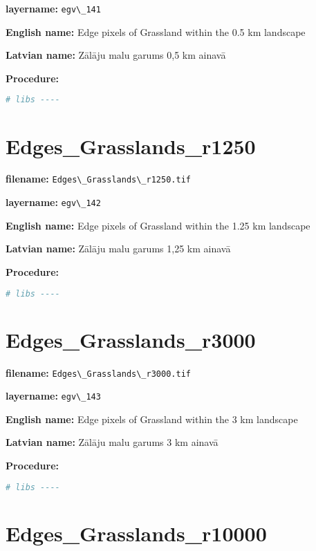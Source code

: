 \documentclass[
]{book}
\newcommand{\passthrough}[1]{#1}
\begin{document}
\textbf{layername:} \passthrough{\lstinline!egv\_141!}

\textbf{English name:} Edge pixels of Grassland within the 0.5 km landscape

\textbf{Latvian name:} Zālāju malu garums 0,5 km ainavā

\textbf{Procedure:}

\begin{lstlisting}[language=R]
# libs ----
\end{lstlisting}

\section{Edges\_Grasslands\_r1250}\label{ch06.142}

\textbf{filename:} \passthrough{\lstinline!Edges\_Grasslands\_r1250.tif!}

\textbf{layername:} \passthrough{\lstinline!egv\_142!}

\textbf{English name:} Edge pixels of Grassland within the 1.25 km landscape

\textbf{Latvian name:} Zālāju malu garums 1,25 km ainavā

\textbf{Procedure:}

\begin{lstlisting}[language=R]
# libs ----
\end{lstlisting}

\section{Edges\_Grasslands\_r3000}\label{ch06.143}

\textbf{filename:} \passthrough{\lstinline!Edges\_Grasslands\_r3000.tif!}

\textbf{layername:} \passthrough{\lstinline!egv\_143!}

\textbf{English name:} Edge pixels of Grassland within the 3 km landscape

\textbf{Latvian name:} Zālāju malu garums 3 km ainavā

\textbf{Procedure:}

\begin{lstlisting}[language=R]
# libs ----
\end{lstlisting}

\section{Edges\_Grasslands\_r10000}\label{ch06.144}
\end{document}
